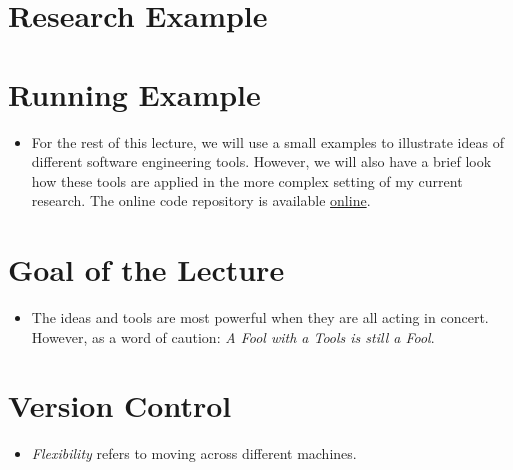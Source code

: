 \section{Research Example}


\section{Running Example}
\begin{itemize}
\item For the rest of this lecture, we will use a small examples to illustrate ideas of different software engineering tools. However, we will also have a brief look how these tools are applied in the more complex setting of my current research. The online code repository is available \href{https://github.com/robustToolbox/package}{online}.
\end{itemize}
\section{Goal of the Lecture}
\begin{itemize}
\item The ideas and tools are most powerful when they are all acting in concert. However, as a word of caution: \textit{A Fool with a Tools is still a Fool}.
\end{itemize}
\section{Version Control}

\begin{itemize}
\item \textit{Flexibility} refers to moving across different machines.
\end{itemize}

\nocite{Bilschak.2016}

